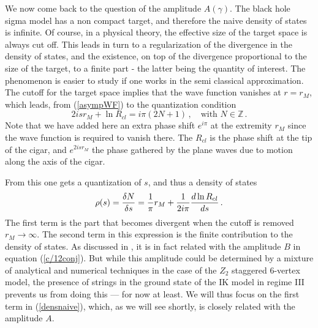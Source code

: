 \documentclass[11pt]{article}
\begin{document}
We now come back to the question of the amplitude $A(\gamma)$. The black hole sigma model has a non compact target, and therefore the naive density of states is infinite. Of course, in a physical theory, the effective size of the target space is always cut off. This leads in turn to a regularization of the divergence in the density of states, and the existence, on top of the divergence proportional to the size of the target, to a finite part - the latter being the quantity of interest. The phenomenon is easier to study if one works in the semi classical approximation. The cutoff for the target space implies that the wave function vanishes at $r=r_M$, which leads, from (\ref{asympWF}) to  the quantization condition 
%
\begin{equation}
2isr_M+\ln R_{cl} =i\pi (2N+1) \,, \quad \mbox{with } N \in \mathbb{Z} \,.
\end{equation}
%
Note that we have added here an extra phase shift $e^{i\pi}$ at the extremity $r_M$ since the wave function is required to vanish there. The $R_{cl}$ is the phase shift at the tip of the cigar, and $e^{2isr_M}$ the phase gathered by the plane waves due to motion along the axis of the cigar. 


From this one gets a quantization of $s$, and thus a  density of states
%
\begin{equation}
\rho(s)={\delta N\over \delta s}={1\over\pi} r_M+{1\over 2i\pi}{d\ln R_{cl}\over ds} \,. \label{densnaive}
\end{equation}
%
The first term is the part that becomes divergent when the cutoff is removed $r_M\to\infty$. The second term in this expression is the finite contribution to the density of states. As discussed in \cite{IkhlefJS3,CanduIkhlef}, it  is in fact related with the amplitude $B$ in equation (\ref{c/12conj}). But while this amplitude could be determined by a mixture of analytical and numerical techniques in the case of the $Z_2$ staggered 6-vertex model, the presence of strings in the ground state of the IK  model in regime III prevents us from doing this --- for now at least. We will thus focus on the first term in (\ref{densnaive}), which, as we will see shortly, is closely related with the  amplitude $A$.
\end{document}
